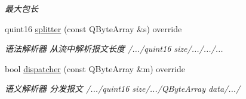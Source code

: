 \begin{DoxyCompactItemize}
\begin{DoxyCompactList}\small\item\em 最大包长 \end{DoxyCompactList}\item 
quint16 \mbox{\hyperlink{class_q_q_t_cloud_protocol_a7aed50bf23eca6f119ed998dffc37cf4}{splitter}} (const Q\+Byte\+Array \&s) override
\begin{DoxyCompactList}\small\item\em 语法解析器 从流中解析报文长度 /.../quint16 size/.../.../... \end{DoxyCompactList}\item 
bool \mbox{\hyperlink{class_q_q_t_cloud_protocol_ae76f5efc67e9ac54a98e934266ecca0a}{dispatcher}} (const Q\+Byte\+Array \&m) override
\begin{DoxyCompactList}\small\item\em 语义解析器 分发报文 /.../quint16 size/.../\+Q\+Byte\+Array data/.../ \end{DoxyCompactList}\end{DoxyCompactItemize}
